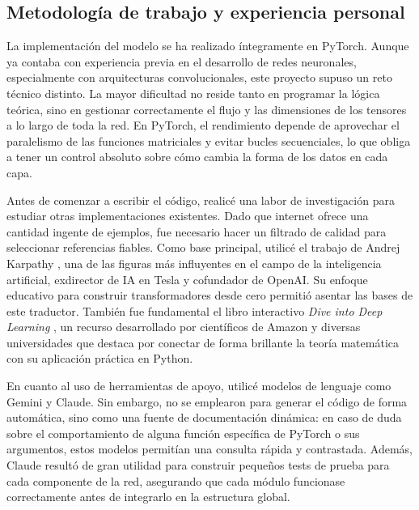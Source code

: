 \subsection{Metodología de trabajo y experiencia personal}

La implementación del modelo se ha realizado íntegramente en PyTorch. Aunque ya contaba con experiencia previa en el 
desarrollo de redes neuronales, especialmente con arquitecturas convolucionales, este proyecto supuso un reto técnico 
distinto. La mayor dificultad no reside tanto en programar la lógica teórica, sino en gestionar correctamente el flujo y 
las dimensiones de los tensores a lo largo de toda la red. En PyTorch, el rendimiento depende de aprovechar el 
paralelismo de las funciones matriciales y evitar bucles secuenciales, lo que obliga a tener un control absoluto sobre 
cómo cambia la forma de los datos en cada capa.


Antes de comenzar a escribir el código, realicé una labor de investigación para estudiar otras implementaciones 
existentes. Dado que internet ofrece una cantidad ingente de ejemplos, fue necesario hacer un filtrado de calidad para 
seleccionar referencias fiables. Como base principal, utilicé el trabajo de Andrej Karpathy 
\cite{karpathy2023gpt_scratch}, una de las figuras más influyentes en el campo de la inteligencia artificial, exdirector 
de IA en Tesla y cofundador de OpenAI. Su enfoque educativo para construir transformadores desde cero permitió asentar 
las bases de este traductor. También fue fundamental el libro interactivo \textit{Dive into Deep Learning} 
\cite{zhang2023dive}, un recurso desarrollado por científicos de Amazon y diversas universidades que destaca por conectar 
de forma brillante la teoría matemática con su aplicación práctica en Python.


En cuanto al uso de herramientas de apoyo, utilicé modelos de lenguaje como Gemini y Claude. Sin embargo, no se emplearon 
para generar el código de forma automática, sino como una fuente de documentación dinámica: en caso de duda sobre el 
comportamiento de alguna función específica de PyTorch o sus argumentos, estos modelos permitían una consulta rápida y 
contrastada. Además, Claude resultó de gran utilidad para construir pequeños tests de prueba para cada componente de la 
red, asegurando que cada módulo funcionase correctamente antes de integrarlo en la estructura global.


